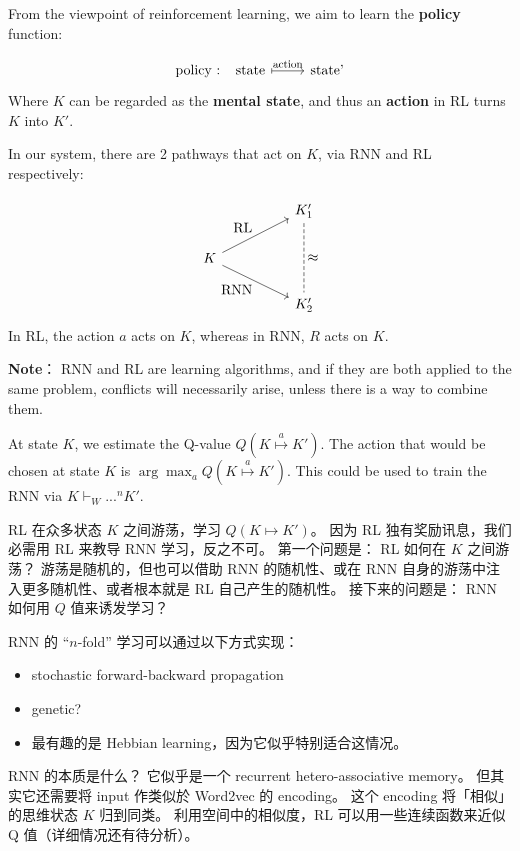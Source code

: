 \documentclass[orivec]{llncs}
\newcommand{\emp}[1]{\textbf{#1}}
\begin{document}
From the viewpoint of reinforcement learning, we aim to learn the \emp{policy} function: \par
\begin{equation}
\begin{tikzcd}[]
\mbox{policy : ~~state} \arrow[r, mapsto, "\scalebox{0.8}{action}"] & \mbox{state'}
\end{tikzcd}
\end{equation}
Where $K$ can be regarded as the \emp{mental state}, and thus an \emp{action} in RL turns $K$ into $K'$.

In our system, there are 2 pathways that act on $K$, via RNN and RL respectively: \par
\begin{equation}
\begin{tikzcd}[column sep=huge]
& K'_1 \arrow[dd, dashed, no head, "\scalebox{1.3}{$\approx$}"] \\
K \arrow[ur, "\mbox{RL}"] \arrow[dr, "\mbox{RNN}"'] & \\
& K'_2
\end{tikzcd}
\end{equation}
In RL, the action $a$ acts on $K$, whereas in RNN, $R$ acts on $K$.

\emp{Note}： RNN and RL are learning algorithms, and if they are both applied to the same problem, conflicts will necessarily arise, unless there is a way to combine them.

At state $K$, we estimate the Q-value $Q(K \stackrel{a}{\mapsto} K')$.  The action that would be chosen at state $K$ is $\displaystyle \arg\max_a Q(K \stackrel{a}{\mapsto} K')$.  This could be used to train the RNN via $\displaystyle K \vdash_W ...^n K'$.

RL 在众多状态 $K$ 之间游荡，学习 $Q(K \mapsto K')$。  因为 RL 独有奖励讯息，我们必需用 RL 来教导 RNN 学习，反之不可。  第一个问题是： RL 如何在 $K$ 之间游荡？   游荡是随机的，但也可以借助 RNN 的随机性、或在 RNN 自身的游荡中注入更多随机性、或者根本就是 RL 自己产生的随机性。  接下来的问题是： RNN 如何用 $Q$ 值来诱发学习？

RNN 的 ``$n$-fold'' 学习可以通过以下方式实现： 
\begin{itemize}
\item stochastic forward-backward propagation
\item genetic?
\item 最有趣的是 Hebbian learning，因为它似乎特别适合这情况。  
\end{itemize}

RNN 的本质是什么？  它似乎是一个 recurrent hetero-associative memory。  但其实它还需要将 input 作类似於 Word2vec 的 encoding。  这个 encoding 将「相似」的思维状态 $K$ 归到同类。  利用空间中的相似度，RL 可以用一些连续函数来近似 Q 值（详细情况还有待分析）。
\end{document}
